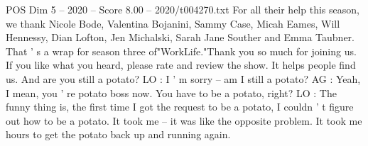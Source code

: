 \begin{textsample}{POS Dim 5 – 2020 – Score 8.00 – 2020/t004270.txt}
For all their help this season, we thank Nicole Bode, Valentina Bojanini, Sammy Case, Micah Eames, Will Hennessy, Dian Lofton, Jen Michalski, Sarah Jane Souther and Emma Taubner.
That ' s a wrap for season three of"WorkLife."Thank you so much for joining us.
If you like what you heard, please rate and review the show.
It helps people find us.
And are you still a potato?
LO : I ' m sorry -- am I still a potato?
AG : Yeah, I mean, you ' re potato boss now.
You have to be a potato, right?
LO : The funny thing is, the first time I got the request to be a potato, I couldn ' t figure out how to be a potato.
It took me -- it was like the opposite problem.
It took me hours to get the potato back up and running again.

\end{textsample}
